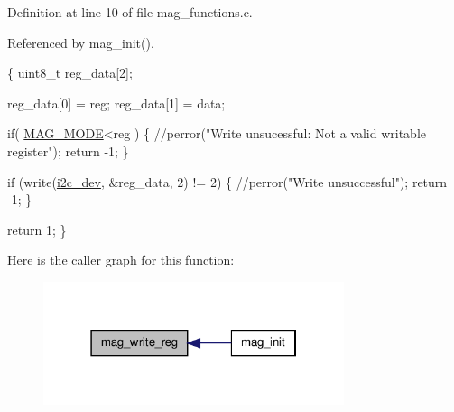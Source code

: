 Definition at line 10 of file mag\-\_\-functions.\-c.



Referenced by mag\-\_\-init().


\begin{DoxyCode}
\{
  uint8\_t reg\_data[2];

  reg\_data[0] = reg;
  reg\_data[1] = data;

  \textcolor{keywordflow}{if}( \hyperlink{communication_2imu__regs_8h_a0173afba6efc0e164495bf506a9758d2}{MAG\_MODE}<reg )
  \{
      \textcolor{comment}{//perror("Write unsucessful: Not a valid writable register");}
      \textcolor{keywordflow}{return} -1;
  \}
        
  \textcolor{keywordflow}{if} (write(\hyperlink{CommunicationV0_2communication_8c_a7751bd45ac1064efb35adf1f19c25db8}{i2c\_dev}, &reg\_data, 2) != 2) \{                
          \textcolor{comment}{//perror("Write unsuccessful");}
          \textcolor{keywordflow}{return} -1;
  \}

  \textcolor{keywordflow}{return} 1;
\}
\end{DoxyCode}


Here is the caller graph for this function\-:
\nopagebreak
\begin{figure}[H]
\begin{center}
\leavevmode
\includegraphics[width=250pt]{group__mag_gab5d0ae421cd4bb10b1b7a1eda167416b_icgraph}
\end{center}
\end{figure}


